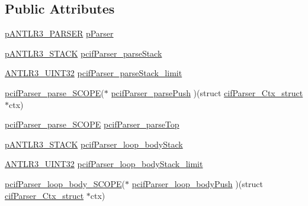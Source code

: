 \subsection*{Public Attributes}
\begin{DoxyCompactItemize}
\item 
\hyperlink{antlr3interfaces_8h_aa68a53fd6b2d899a8136c64e08fc1dbd}{p\-A\-N\-T\-L\-R3\-\_\-\-P\-A\-R\-S\-E\-R} \hyperlink{structcif_parser___ctx__struct_ab6328678e99374c82ab1a70821cba7a2}{p\-Parser}
\item 
\hyperlink{antlr3interfaces_8h_acc1ac4dd91a4d941b628467ac08c0cea}{p\-A\-N\-T\-L\-R3\-\_\-\-S\-T\-A\-C\-K} \hyperlink{structcif_parser___ctx__struct_a1712f4449b360f074c7660322e250fa6}{pcif\-Parser\-\_\-parse\-Stack}
\item 
\hyperlink{antlr3defs_8h_ac41f744abd0fd25144b9eb9d11b1dfd1}{A\-N\-T\-L\-R3\-\_\-\-U\-I\-N\-T32} \hyperlink{structcif_parser___ctx__struct_ad2ac1b7a4bf896cd9bee4fc71b72aafd}{pcif\-Parser\-\_\-parse\-Stack\-\_\-limit}
\item 
\hyperlink{cif_parser_8h_a80a5a0ef2513748710a2b15a7fbc3a9c}{pcif\-Parser\-\_\-parse\-\_\-\-S\-C\-O\-P\-E}($\ast$ \hyperlink{structcif_parser___ctx__struct_a0b70618b0710af6565700ceeb51a7014}{pcif\-Parser\-\_\-parse\-Push} )(struct \hyperlink{structcif_parser___ctx__struct}{cif\-Parser\-\_\-\-Ctx\-\_\-struct} $\ast$ctx)
\item 
\hyperlink{cif_parser_8h_a80a5a0ef2513748710a2b15a7fbc3a9c}{pcif\-Parser\-\_\-parse\-\_\-\-S\-C\-O\-P\-E} \hyperlink{structcif_parser___ctx__struct_a76beed3021de41b81ff5736bd7b71f0b}{pcif\-Parser\-\_\-parse\-Top}
\item 
\hyperlink{antlr3interfaces_8h_acc1ac4dd91a4d941b628467ac08c0cea}{p\-A\-N\-T\-L\-R3\-\_\-\-S\-T\-A\-C\-K} \hyperlink{structcif_parser___ctx__struct_a2f617afc3c3bc1469e67022c6c1f734c}{pcif\-Parser\-\_\-loop\-\_\-body\-Stack}
\item 
\hyperlink{antlr3defs_8h_ac41f744abd0fd25144b9eb9d11b1dfd1}{A\-N\-T\-L\-R3\-\_\-\-U\-I\-N\-T32} \hyperlink{structcif_parser___ctx__struct_a42a803af5b4d22bca623e886dbdd656d}{pcif\-Parser\-\_\-loop\-\_\-body\-Stack\-\_\-limit}
\item 
\hyperlink{cif_parser_8h_aea2d24aee164ae2f6ee1f5c8e4e3f17f}{pcif\-Parser\-\_\-loop\-\_\-body\-\_\-\-S\-C\-O\-P\-E}($\ast$ \hyperlink{structcif_parser___ctx__struct_a6b373b1b4ec4bdb9934d6a484210f668}{pcif\-Parser\-\_\-loop\-\_\-body\-Push} )(struct \hyperlink{structcif_parser___ctx__struct}{cif\-Parser\-\_\-\-Ctx\-\_\-struct} $\ast$ctx)
\item 

\end{DoxyCompactItemize}
